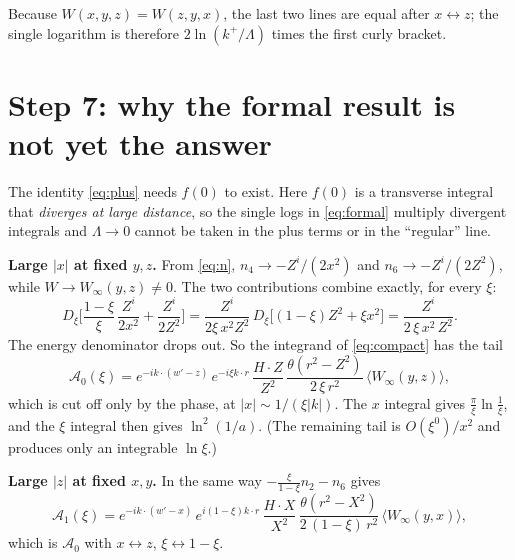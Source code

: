 \documentclass[11pt,a4paper]{article}
\newcommand{\Winf}{W_\infty}
\newcommand{\cl}[1]{\big\langle #1\big\rangle}
\begin{document}
Because $W(x,y,z)=W(z,y,x)$, the last two lines are equal after $x\leftrightarrow z$; the single
logarithm is therefore $2\ln(k^+/\Lambda)$ times the first curly bracket.

\section{Step 7: why the formal result is not yet the answer}
\begin{warn}
The identity \eqref{eq:plus} needs $f(0)$ to exist. Here $f(0)$ is a transverse integral that
\emph{diverges at large distance}, so the single logs in \eqref{eq:formal} multiply divergent
integrals and $\Lambda\to0$ cannot be taken in the plus terms or in the ``regular'' line.
\end{warn}

\textbf{Large $|x|$ at fixed $y,z$.} From \eqref{eq:n}, $n_4\to-Z^i/(2x^2)$ and $n_6\to-Z^i/(2Z^2)$, while
$W\to\Winf(y,z)\neq0$. The two contributions combine exactly, for every $\xi$:
\begin{equation}
D_\xi\Big[\frac{1-\xi}{\xi}\,\frac{Z^i}{2x^2}+\frac{Z^i}{2Z^2}\Big]
=\frac{Z^i}{2\xi\,x^2Z^2}\,D_\xi\big[(1-\xi)Z^2+\xi x^2\big]=\frac{Z^i}{2\,\xi\,x^2\,Z^2}.
\end{equation}
The energy denominator drops out. So the integrand of \eqref{eq:compact} has the tail
\begin{equation}
\mathcal A_0(\xi)=e^{-ik\cdot(w'-z)}\,e^{-i\xi k\cdot r}\,\frac{H\cdot Z}{Z^2}\,
\frac{\theta(r^2-Z^2)}{2\,\xi\,r^2}\,\cl{\Winf(y,z)},
\label{eq:A0}
\end{equation}
which is cut off only by the phase, at $|x|\sim1/(\xi|k|)$. The $x$ integral gives
$\frac{\pi}{\xi}\ln\frac1\xi$, and the $\xi$ integral then gives $\ln^2(1/a)$. (The remaining
tail is $O(\xi^0)/x^2$ and produces only an integrable $\ln\xi$.)

\textbf{Large $|z|$ at fixed $x,y$.} In the same way $-\frac{\xi}{1-\xi}n_2-n_6$ gives
\begin{equation}
\mathcal A_1(\xi)=e^{-ik\cdot(w'-x)}\,e^{i(1-\xi)k\cdot r}\,\frac{H\cdot X}{X^2}\,
\frac{\theta(r^2-X^2)}{2\,(1-\xi)\,r^2}\,\cl{\Winf(y,x)} ,
\end{equation}
which is $\mathcal A_0$ with $x\leftrightarrow z$, $\xi\leftrightarrow1-\xi$.
\end{document}
